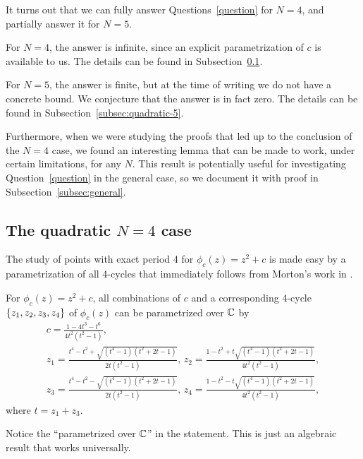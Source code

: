 It turns out that we can fully answer Questions~\ref{question} for
$N = 4$, and partially answer it for $N = 5$.

For $N = 4$, the answer is infinite, since an explicit parametrization
of $c$ is available to us. The details can be found in
Subsection~\ref{subsec:quadratic-4}.

For $N = 5$, the answer is finite, but at the time of writing we do
not have a concrete bound. We conjecture that the answer is in fact
zero. The details can be found in Subsection~\ref{subsec:quadratic-5}.

Furthermore, when we were studying the proofs that led up to the
conclusion of the $N = 4$ case, we found an interesting lemma that can
be made to work, under certain limitations, for any $N$. This result
is potentially useful for investigating Question~\ref{question} in the
general case, so we document it with proof in
Subsection~\ref{subsec:general}.

\subsection{The quadratic $N = 4$ case}
\label{subsec:quadratic-4}

The study of points with exact period 4 for $\phi_c(z) = z^2 + c$ is
made easy by a parametrization of all 4-cycles that immediately
follows from Morton's work in \cite{MR1665198}.

\begin{proposition}
  For $\phi_c(z) = z^2 + c$, all combinations of $c$ and a
  corresponding 4-cycle $\left\{z_1, z_2, z_3, z_4\right\}$ of $\phi_c(z)$ can
  be parametrized over $\mathbb{C}$ by
  \begin{equation}
    \label{eq:4-param}
    \begin{gathered}
      c = \frac{1 - 4t^3 - t^6}{4t^2(t^2 - 1)}, \\
      z_1 = \frac{t^4 - t^2 + \sqrt{(t^4 - 1)(t^2 + 2t - 1)}}{2t(t^2 -
        1)},\,
      z_2 = \frac{1 - t^2 + t \sqrt{(t^4 - 1)(t^2 + 2t - 1)}}{4t^2(t^2
        - 1)}, \\
      z_3 = \frac{t^4 - t^2 - \sqrt{(t^4 - 1)(t^2 + 2t - 1)}}{2t(t^2 -
        1)},\,
      z_4 = \frac{1 - t^2 - t \sqrt{(t^4 - 1)(t^2 + 2t - 1)}}{4t^2(t^2
        - 1)},
    \end{gathered}
  \end{equation}
  where $t = z_1 + z_3$.
\end{proposition}

\begin{remark}
  Notice the ``parametrized over $\mathbb{C}$'' in the statement. This is just
  an algebraic result that works universally.
\end{remark}

